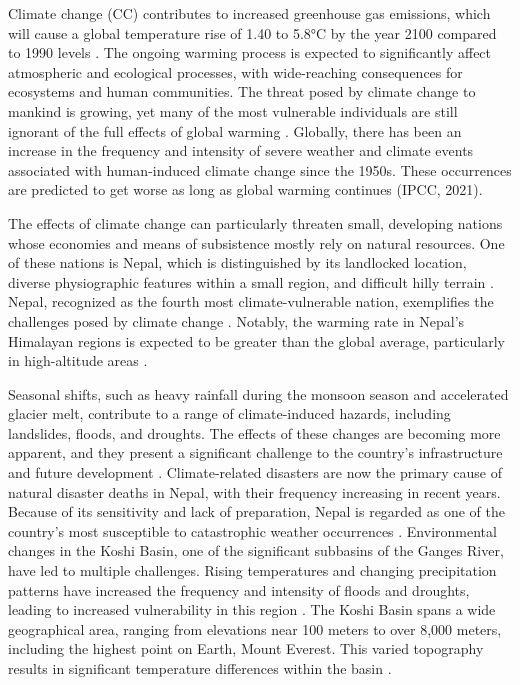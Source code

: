Climate change (CC) contributes to increased greenhouse gas emissions, which will cause a global temperature rise of 1.40 to 5.8°C by the year 2100 compared to 1990 levels \parencite{mccarthy_climate_2001}. The ongoing warming process is expected to significantly affect atmospheric and ecological processes, with wide-reaching consequences for ecosystems and human communities. The threat posed by climate change to mankind is growing, yet many of the most vulnerable individuals are still ignorant of the full effects of global warming \parencite{maharjan_tharu_nodate}. Globally, there has been an increase in the frequency and intensity of severe weather and climate events associated with human-induced climate change since the 1950s. These occurrences are predicted to get worse as long as global warming continues \parencite{intergovernmental_panel_on_climate_change_ipcc_climate_2023} (IPCC, 2021).

The effects of climate change can particularly threaten small, developing nations whose economies and means of subsistence mostly rely on natural resources. One of these nations is Nepal, which is distinguished by its landlocked location, diverse physiographic features within a small region, and difficult hilly terrain \parencite{shrestha_climate_2011}. Nepal, recognized as the fourth most climate-vulnerable nation, exemplifies the challenges posed by climate change \parencite{manandhar_adapting_2011,reilly_climate_in_usa}. Notably, the warming rate in Nepal's Himalayan regions is expected to be greater than the global average, particularly in high-altitude areas \parencite{casestudy_bhattarai,yao_recent_2019,shrestha_maximum_1999}.


Seasonal shifts, such as heavy rainfall during the monsoon season and accelerated glacier melt, contribute to a range of climate-induced hazards, including landslides, floods, and droughts. The effects of these changes are becoming more apparent, and they present a significant challenge to the country’s infrastructure and future development \parencite{pokhrel_climate_2013}. Climate-related disasters are now the primary cause of natural disaster deaths in Nepal, with their frequency increasing in recent years. Because of its sensitivity and lack of preparation, Nepal is regarded as one of the country’s most susceptible to catastrophic weather occurrences \parencite{aksha_spatial_2018}. Environmental changes in the Koshi Basin, one of the significant subbasins of the Ganges River, have led to multiple challenges. Rising temperatures and changing precipitation patterns have increased the frequency and intensity of floods and droughts, leading to increased vulnerability in this region \parencite{bastakoti_agriculture_2017}. The Koshi Basin spans a wide geographical area, ranging from elevations near 100 meters to over 8,000 meters, including the highest point on Earth, Mount Everest. This varied topography results in significant temperature differences within the basin \parencite{bhatt_climate_2014}.

